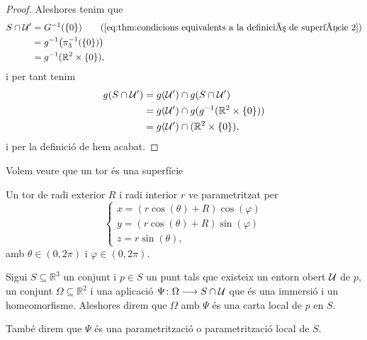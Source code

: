\documentclass[../Apunts.tex]{subfiles}
\begin{document}
\begin{proof}
		Aleshores tenim que
		\begin{align*}
			S\cap\obert{U}'&=G^{-1}(\{0\}) \tag{\ref{eq:thm:condicions equivalents a la definició de superfície 2}}\\
			&=g^{-1}\big(\pi_{3}^{-1}(\{0\})\big) \\
			&=g^{-1}(\mathbb{R}^{2}\times\{0\}),
		\end{align*}
		i per tant tenim
		\begin{align*}
			g(S\cap\mathcal{U}')&=g(\mathcal{U}')\cap g(S\cap\mathcal{U}') \\
			&=g(\mathcal{U}')\cap g(g^{-1}(\mathbb{R}^{2}\times\{0\})) \\
			&=g(\mathcal{U}')\cap(\mathbb{R}^{2}\times\{0\}),
		\end{align*}
		i per la definició de  hem acabat.
	\end{proof}
	\begin{example}
		\label{ex:un tor és una superfície}
		Volem veure que un tor és una superfície
	\end{example}
	\begin{solution}
		Un tor de radi exterior \(R\) i radi interior \(r\) ve parametritzat per
		\[\begin{cases*}
			x=(r\cos(\theta)+R)\cos(\varphi) \\
			y=(r\cos(\theta)+R)\sin(\varphi) \\
			z=r\sin(\theta),
		\end{cases*}\]
		amb \(\theta\in(0,2\pi)\) i \(\varphi\in(0,2\pi)\).
	\end{solution}
	\begin{definition}
		\label{def:carta local}
		\label{def:parametrització local d'una superfície}
		\label{def:parametrització d'una superfície}
		Sigui \(S\subseteq\mathbb{R}^{3}\) un conjunt i \(p\in S\) un punt tals que existeix un entorn obert \(\mathcal{U}\) de \(p\), un conjunt \(\Omega\subseteq\mathbb{R}^{2}\) i una aplicació \(\Psi\colon\Omega\longrightarrow S\cap\mathcal{U}\) que és una immersió i un homeomorfisme. Aleshores direm que \(\Omega\) amb \(\Psi\) és una carta local de \(p\) en \(S\).
		
		També direm que \(\Psi\) és una parametrització o parametrització local de \(S\).
	\end{definition}
\end{document}
